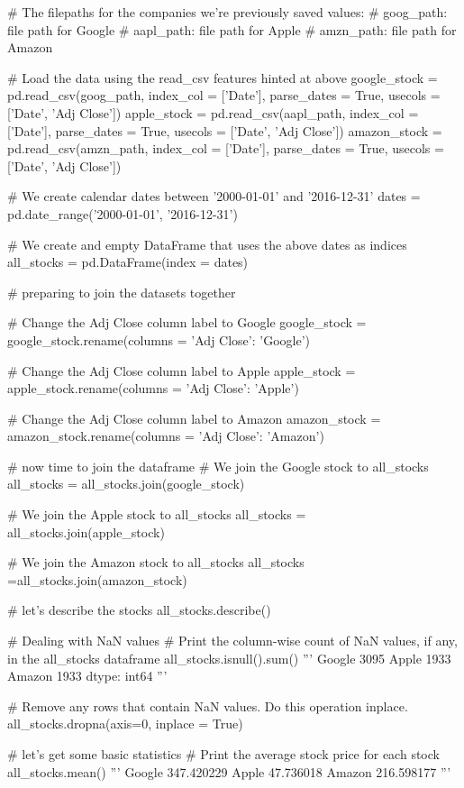 \documentclass{article}
\begin{document}
\begin{python}
	# The filepaths for the companies we're previously saved values:
	# goog_path: file path for Google
	# aapl_path: file path for Apple
	# amzn_path: file path for Amazon
	
	# Load the data using the read_csv features hinted at above
	google_stock = pd.read_csv(goog_path, index_col = ['Date'], parse_dates = True, usecols = ['Date', 'Adj Close'])
	apple_stock = pd.read_csv(aapl_path, index_col = ['Date'], parse_dates = True, usecols = ['Date', 'Adj Close'])
	amazon_stock = pd.read_csv(amzn_path, index_col = ['Date'], parse_dates = True, usecols = ['Date', 'Adj Close'])
	
	# We create calendar dates between '2000-01-01' and  '2016-12-31'
	dates = pd.date_range('2000-01-01', '2016-12-31')
	
	# We create and empty DataFrame that uses the above dates as indices
	all_stocks = pd.DataFrame(index = dates)
	
	# preparing to join the datasets together
	
	# Change the Adj Close column label to Google
	google_stock = google_stock.rename(columns = {'Adj Close': 'Google'})
	
	# Change the Adj Close column label to Apple
	apple_stock = apple_stock.rename(columns = {'Adj Close': 'Apple'})
	
	# Change the Adj Close column label to Amazon
	amazon_stock = amazon_stock.rename(columns = {'Adj Close': 'Amazon'})
	
	# now time to join the dataframe
	# We join the Google stock to all_stocks
	all_stocks = all_stocks.join(google_stock)
	
	# We join the Apple stock to all_stocks
	all_stocks = all_stocks.join(apple_stock)
	
	# We join the Amazon stock to all_stocks
	all_stocks =all_stocks.join(amazon_stock)
	
	# let's describe the stocks
	all_stocks.describe()
	
	# Dealing with NaN values
	# Print the column-wise count of NaN values, if any, in the all_stocks dataframe
	all_stocks.isnull().sum()
	'''
	Google    3095
	Apple     1933
	Amazon    1933
	dtype: int64
	'''
	
	# Remove any rows that contain NaN values. Do this operation inplace. 
	all_stocks.dropna(axis=0, inplace = True)
	
	# let's get some basic statistics
	# Print the average stock price for each stock
	all_stocks.mean()
	'''
	Google    347.420229
	Apple      47.736018
	Amazon    216.598177
	'''
	

\end{python}
\end{document}
